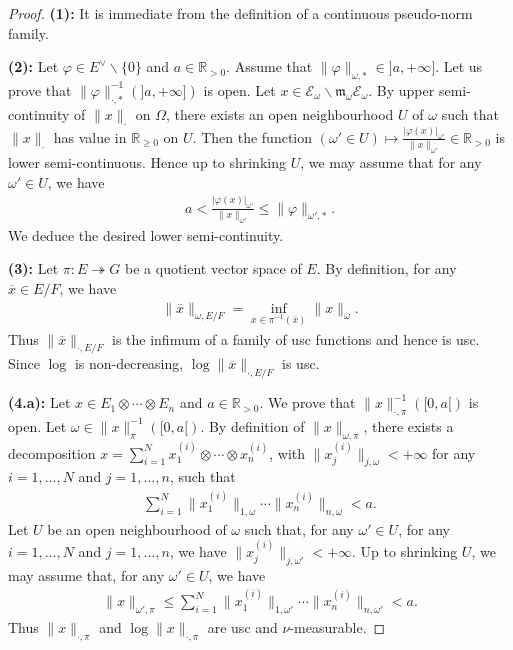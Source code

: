 \documentclass [11pt,reqno]{amsart}
\def\bR{{\mathbb{R}}}
\newcommand{\1}{\mathmybb{1}}
\def\cE{{\mathcal{E}}}
\def\m{\mathfrak m}
\def\setminus{\smallsetminus}
\begin{document}
\begin{proof}
\textbf{(1):} It is immediate from the definition of a continuous pseudo-norm family.

\textbf{(2):} Let $\varphi\in E^{\vee}\setminus\{0\}$ and $a\in\bR_{>0}$. Assume that $\|\varphi\|_{\omega,\ast}\in ]a,+\infty]$. Let us prove that $\|\varphi\|_{\cdot,\ast}^{-1}(]a,+\infty])$ is open. Let $x\in \cE_{\omega}\setminus\m_{\omega}\cE_{\omega}$. By upper semi-continuity of $\|x\|_{\cdot}$ on $\Omega$, there exists an open neighbourhood $U$ of $\omega$ such that $\|x\|_{\cdot}$ has value in $\bR_{\geq 0}$ on $U$. Then the function $(\omega'\in U)\mapsto \frac{|\varphi(x)|_{\omega'}}{\|x\|_{\omega'}}\in\bR_{>0}$ is lower semi-continuous. Hence up to shrinking $U$, we may assume that for any $\omega'\in U$, we have
\begin{align*}
a<\frac{|\varphi(x)|_{\omega'}}{\|x\|_{\omega'}} \leq \|\varphi\|_{\omega',\ast}.
\end{align*}
We deduce the desired lower semi-continuity.

\textbf{(3):} Let $\pi: E \twoheadrightarrow G$ be a quotient vector space of $E$. By definition, for any $\overline{x}\in E/F$, we have
\begin{align*}
\|\overline{x}\|_{\omega,E/F} = \displaystyle\inf_{x\in \pi^{-1}(\overline{x})} \|x\|_{\omega}.
\end{align*}
Thus $\|\overline{x}\|_{\cdot,E/F}$ is the infimum of a family of usc functions and hence is usc. Since $\log$ is non-decreasing, $\log\|\overline{x}\|_{\cdot,E/F}$ is usc.

\textbf{(4.a):} Let $x\in E_1 \otimes\cdots\otimes E_n$ and $a\in \bR_{>0}$. We prove that $\|x\|_{\cdot,\pi}^{-1}([0,a[)$ is open. Let $\omega \in \|x\|_{\pi}^{-1}([0,a[)$. By definition of $\|x\|_{\omega,\pi}$, there exists a decomposition $x=\sum_{i=1}^N x_1^{(i)}\otimes\cdots\otimes x_n^{(i)}$, with $\|x_j^{(i)}\|_{j,\omega}<+\infty$ for any $i=1,...,N$ and $j=1,...,n$, such that
\begin{align*}
\displaystyle\sum_{i=1}^{N}\|x_1^{(i)}\|_{1,\omega}\cdots\|x_n^{(i)}\|_{n,\omega} < a.
\end{align*}
Let $U$ be an open neighbourhood of $\omega$ such that, for any $\omega'\in U$, for any $i=1,...,N$ and $j=1,...,n$, we have $\|x_j^{(i)}\|_{j,\omega'}<+\infty$. Up to shrinking $U$, we may assume that, for any $\omega'\in U$, we have
\begin{align*}
\|x\|_{\omega',\pi}\leq \displaystyle\sum_{i=1}^{N}\|x_1^{(i)}\|_{1,\omega'}\cdots\|x_n^{(i)}\|_{n,\omega'} < a.
\end{align*}
Thus $\|x\|_{\cdot,\pi}$ and $\log\|x\|_{\cdot,\pi}$ are usc and $\nu$-measurable.


\end{proof}
\end{document}
